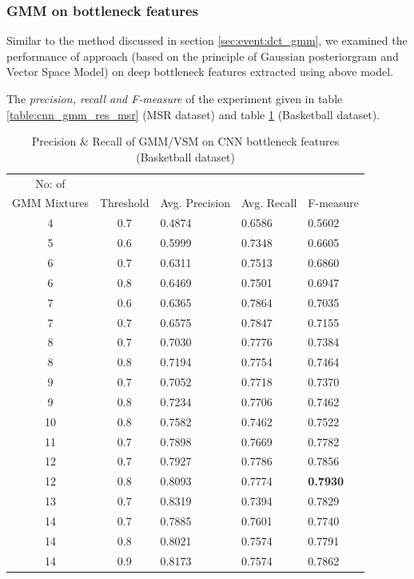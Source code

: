 \subsubsection{GMM on bottleneck features}
Similar to the method discussed in section \ref{sec:event:dct_gmm}, we examined the performance of approach (based on the principle of Gaussian posteriorgram and Vector Space Model) on deep bottleneck features extracted using above model. 

The \textit{precision, recall and F-measure} of the experiment given in table \ref{table:cnn_gmm_res_msr} (MSR dataset) and table \ref{table:cnn_gmm_res_basket} (Basketball dataset).

\begin{table}[ht]
\caption[Event spotting using GMM/VSM on CNN(Gray,Frame diff,Edge) bottleneck features (MSR Action Dataset) ]{ Precision \& Recall  of GMM/VSM on CNN bottleneck features (Basketball dataset)}
\label{table:cnn_gmm_res_basket}
\centering
\begin{tabular}{|c|c|l|l|l|}
\hline
No: of &&&&\\
GMM Mixtures & Threshold & Avg. Precision & Avg. Recall & F-measure\\
\hline
\hline
4 	&0.7 	&0.4874 	& 0.6586	&0.5602\\
5 	&0.6 	&0.5999 	& 0.7348	&0.6605\\
6 	&0.7 	&0.6311 	& 0.7513	&0.6860\\
6 	&0.8 	&0.6469 	& 0.7501	&0.6947\\
7 	&0.6 	&0.6365 	& 0.7864	&0.7035\\
7 	&0.7 	&0.6575 	& 0.7847	&0.7155\\
8 	&0.7 	&0.7030 	& 0.7776	&0.7384\\
8 	&0.8 	&0.7194 	& 0.7754	&0.7464\\
9 	&0.7 	&0.7052 	& 0.7718	&0.7370\\
9 	&0.8 	&0.7234 	& 0.7706	&0.7462\\
10 	&0.8 	&0.7582 	& 0.7462	&0.7522\\
11 	&0.7 	&0.7898 	& 0.7669	&0.7782\\
12 	&0.7 	&0.7927 	& 0.7786	&0.7856\\
12 	&0.8 	&0.8093 	& 0.7774	&\textbf{0.7930}\\
13 	&0.7 	&0.8319 	& 0.7394	&0.7829\\
14 	&0.7 	&0.7885 	& 0.7601	&0.7740\\
14 	&0.8 	&0.8021 	& 0.7574	&0.7791\\
14 	&0.9 	&0.8173 	& 0.7574	&0.7862\\
\hline  
\end{tabular}
\end{table}
\pagebreak
